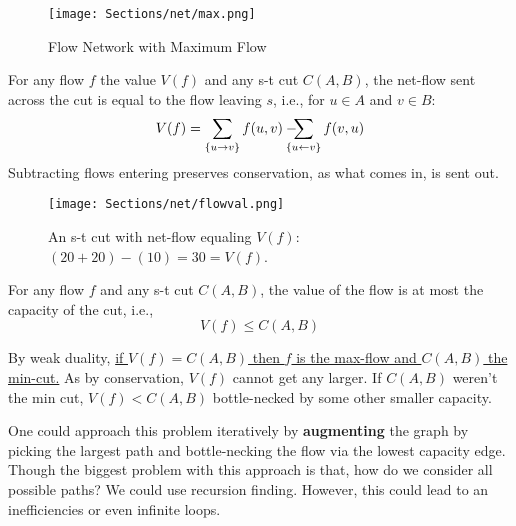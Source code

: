 \begin{figure}[h]
    \centering
    \texttt{[image: Sections/net/max.png]}
    \caption{Flow Network with Maximum Flow}
\end{figure}

\newpage
\begin{Def}

    For any flow $f$ the value $V(f)$ and any s-t cut $C(A,B)$, the net-flow sent across the cut is equal to the flow leaving $s$, i.e.,
    for $u \in A$ and $v \in B$:
    \begin{equation}
        V(f) = \sum_{\{u\to v\}} f(u,v) - \hspace{-1em} \sum_{\{u\leftarrow v\}} f(v,u)
    \end{equation}
    Subtracting flows entering preserves conservation, as what comes in, is sent out.
\end{Def}

\begin{figure}[h]
    \centering
    \texttt{[image: Sections/net/flowval.png]}
    \caption{An s-t cut with net-flow equaling $V(f)$: $(20+20)-(10) = 30 = V(f)$.}
\end{figure}

\begin{Def}

    For any flow $f$ and any s-t cut $C(A,B)$, the value of the flow is at most the capacity of the cut, i.e.,
    \begin{equation}
        V(f) \leq C(A,B)
    \end{equation}
\end{Def}

\begin{Def}

    By weak duality, \underline{if $V(f)=C(A,B)$ then $f$ is the max-flow and $C(A,B)$ the min-cut.} As by 
    conservation, $V(f)$ cannot get any larger. If $C(A,B)$ weren't the min cut,
    $V(f)<C(A,B)$ bottle-necked by some other smaller capacity.
\end{Def}

\noindent
One could approach this problem iteratively by \textbf{augmenting} the graph by picking the largest path and 
bottle-necking the flow via the lowest capacity edge.\\

\noindent
Though the biggest problem with this approach is that, how do we consider all possible paths? We
could use recursion finding. However, this could lead to an inefficiencies or even infinite loops.

